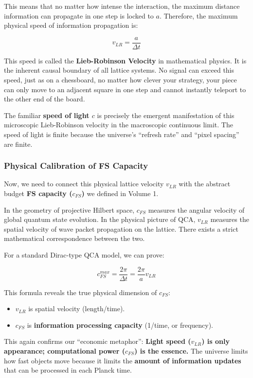 This means that no matter how intense the interaction, the maximum distance information can propagate in one step is locked to $a$. Therefore, the maximum physical speed of information propagation is:

\[v_{LR} = \frac{a}{\Delta t}\]

This speed is called the \textbf{Lieb-Robinson Velocity} in mathematical physics. It is the inherent causal boundary of all lattice systems. No signal can exceed this speed, just as on a chessboard, no matter how clever your strategy, your piece can only move to an adjacent square in one step and cannot instantly teleport to the other end of the board.

The familiar \textbf{speed of light $c$} is precisely the emergent manifestation of this microscopic Lieb-Robinson velocity in the macroscopic continuous limit. The speed of light is finite because the universe's ``refresh rate'' and ``pixel spacing'' are finite.

\subsubsection{Physical Calibration of FS Capacity}

Now, we need to connect this physical lattice velocity $v_{LR}$ with the abstract budget \textbf{FS capacity ($c_{FS}$)} we defined in Volume 1.

In the geometry of projective Hilbert space, $c_{FS}$ measures the angular velocity of global quantum state evolution. In the physical picture of QCA, $v_{LR}$ measures the spatial velocity of wave packet propagation on the lattice. There exists a strict mathematical correspondence between the two.

For a standard Dirac-type QCA model, we can prove:

\[c_{FS}^{max} = \frac{2\pi}{\Delta t} = \frac{2\pi}{a} v_{LR}\]

This formula reveals the true physical dimension of $c_{FS}$:

\begin{itemize}
\item $v_{LR}$ is spatial velocity (length/time).

\item $c_{FS}$ is \textbf{information processing capacity} (1/time, or frequency).
\end{itemize}

This again confirms our ``economic metaphor'': \textbf{Light speed ($v_{LR}$) is only appearance; computational power ($c_{FS}$) is the essence.} The universe limits how fast objects move because it limits the \textbf{amount of information updates} that can be processed in each Planck time.

